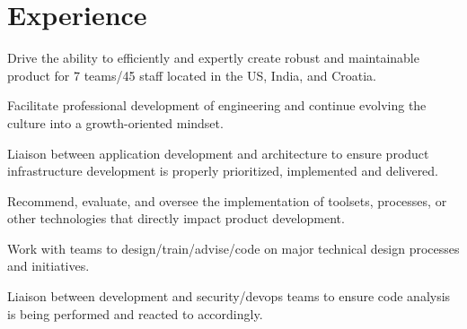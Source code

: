 \documentclass[]{deedy-resume}
\begin{document}
\hfill
\begin{minipage}[t]{0.66\textwidth} 


\section{Experience}
Drive the ability to efficiently and expertly create robust and maintainable product for 7 teams/45 staff located in the US, India, and Croatia.
\vspace{\topsep} %
\begin{tightemize}
\item Facilitate professional development of engineering and continue evolving the culture into a growth-oriented mindset.
\item Liaison between application development and architecture to ensure product infrastructure development is properly prioritized, implemented and delivered.
\item Recommend, evaluate, and oversee the implementation of toolsets, processes, or other technologies that directly impact product development.
\item Work with teams to design/train/advise/code on major technical design processes and initiatives.
\item Liaison between development and security/devops teams to ensure code analysis is being performed and reacted to accordingly.
\end{tightemize}
\sectionsep




\end{minipage}
\end{document}
